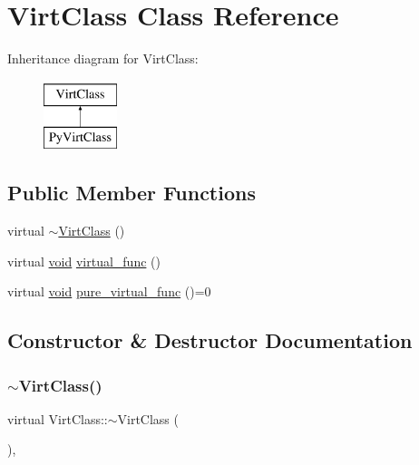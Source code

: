 \hypertarget{class_virt_class}{}\section{Virt\+Class Class Reference}
\label{class_virt_class}
Inheritance diagram for Virt\+Class\+:\begin{figure}[H]
\begin{center}
\leavevmode
\includegraphics[height=2.000000cm]{class_virt_class}
\end{center}
\end{figure}
\subsection*{Public Member Functions}
\begin{DoxyCompactItemize}
\item 
virtual \mbox{\hyperlink{class_virt_class_a5845e3c5048eff99beaf7557bfe12f1f}{$\sim$\+Virt\+Class}} ()
\item 
virtual \mbox{\hyperlink{_s_d_l__opengles2__gl2ext_8h_ae5d8fa23ad07c48bb609509eae494c95}{void}} \mbox{\hyperlink{class_virt_class_a231872d2e6f4009701a0aa3d07b1e560}{virtual\+\_\+func}} ()
\item 
virtual \mbox{\hyperlink{_s_d_l__opengles2__gl2ext_8h_ae5d8fa23ad07c48bb609509eae494c95}{void}} \mbox{\hyperlink{class_virt_class_a7d4ad19228b659f123899170a42898c6}{pure\+\_\+virtual\+\_\+func}} ()=0
\end{DoxyCompactItemize}


\subsection{Constructor \& Destructor Documentation}
\mbox{\label{class_virt_class_a5845e3c5048eff99beaf7557bfe12f1f}} 
\subsubsection{\texorpdfstring{$\sim$VirtClass()}{~VirtClass()}}
{\footnotesize\ttfamily virtual Virt\+Class\+::$\sim$\+Virt\+Class (\begin{DoxyParamCaption}{ }\end{DoxyParamCaption})\hspace{0.3cm}{\ttfamily [inline]}, {\ttfamily [virtual]}}



